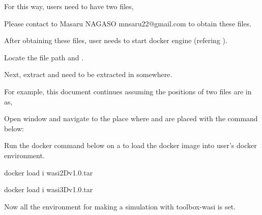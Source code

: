 \documentclass[letterpaper,10pt,english]{sphinxmanual}
\begin{document}
For this way, users need to have two files,

\begin{sphinxVerbatim}[commandchars=\\\{\}]
\end{sphinxVerbatim}

Please contact to Masaru NAGASO mnsaru22@gmail.com to obtain these files.

After obtaining these files, user needs to start docker engine (refering {\hyperref[\detokenize{tutorial::doc}]{}}).

Locate the file path  and .

Next, extract  and  need to be extracted in somewhere.

For example, this document continues assuming the positions of two files are in  as,

Open  window and navigate to the place where  and  are placed with the command below:


Run the docker command below on a  to load the docker image into user’s docker environment.

\begin{sphinxVerbatim}[commandchars=\\\{\}]
docker load \PYGZhy{}i wasi\PYGZus{}2D\PYGZus{}v1.0.tar
\end{sphinxVerbatim}

\begin{sphinxVerbatim}[commandchars=\\\{\}]
docker load \PYGZhy{}i wasi\PYGZus{}3D\PYGZus{}v1.0.tar
\end{sphinxVerbatim}

Now all the environment for making a simulation with toolbox-wasi is set.
\end{document}
